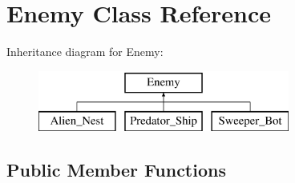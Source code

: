 \hypertarget{class_enemy}{}\section{Enemy Class Reference}
\label{class_enemy}
Inheritance diagram for Enemy\+:\begin{figure}[H]
\begin{center}
\leavevmode
\includegraphics[height=2.000000cm]{class_enemy}
\end{center}
\end{figure}
\subsection*{Public Member Functions}
